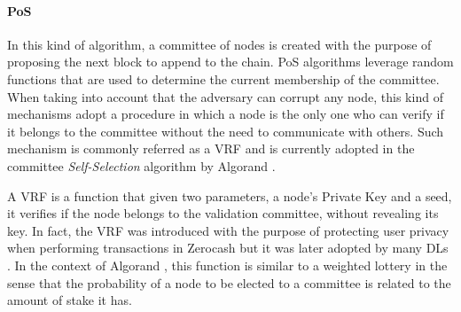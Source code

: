 

\paragraph{\gls{PoS}}

In this kind of algorithm, a committee of nodes is created with the purpose of proposing the next block to append to the chain. \gls{PoS} algorithms leverage random functions that are used to determine the current membership of the committee. When taking into account that the adversary can corrupt any node, this kind of mechanisms adopt a procedure in which a node is the only one who can verify if it belongs to the committee without the need to communicate with others. Such mechanism is commonly referred as a \gls{VRF} and is currently adopted in the committee \textit{Self-Selection} algorithm by Algorand \cite{algorand_scaling_bft_cryptocurrencies}.

A \gls{VRF} \cite{vrf} is a function that given two parameters, a node's Private Key and a seed, it verifies if the node belongs to the validation committee, without revealing its key. In fact, the \gls{VRF} was introduced with the purpose of protecting user privacy when performing transactions in Zerocash \cite{zerocash} but it was later adopted by many \gls{DL}s \cite{ouroboros-pos, dfinity}. In the context of Algorand \cite{algorand_scaling_bft_cryptocurrencies}, this function is similar to a weighted lottery in the sense that the probability of a node to be elected to a committee is related to the amount of stake it has. 

